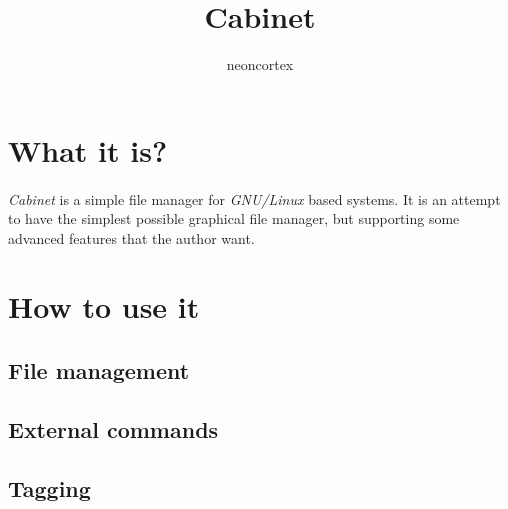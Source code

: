 \documentclass{article}
\title{Cabinet}
\author{neoncortex}
\begin{document}
\maketitle

\section{What it is?}
\label{section-what-it-is}
\paragraph{}
\textit{Cabinet}
is a simple file manager for
\textit{GNU/Linux}
based systems.
It is an attempt to have the simplest possible graphical file manager, but supporting some advanced features that the author want.

\section{How to use it}
\label{section-how-to-use-it}
\paragraph{}

\subsection{File management}
\label{section-file-management}
\paragraph{}

\subsection{External commands}
\label{}
\paragraph{}

\subsection{Tagging}
\label{section-tagging}
\paragraph{}
\end{document}
